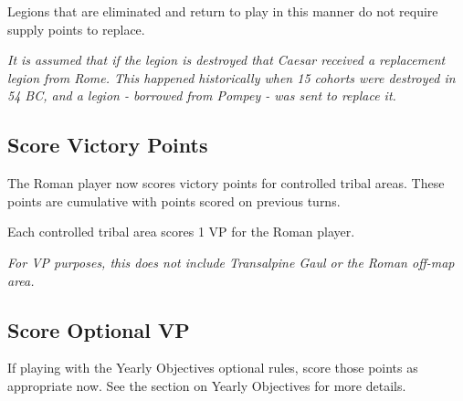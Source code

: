 Legions that are eliminated and return to play in this manner do not require supply points to replace.

\textit{It is assumed that if the legion is destroyed that Caesar received a replacement legion from Rome. This happened historically when 15 cohorts were destroyed in 54 BC, and a legion - borrowed from Pompey - was sent to replace it.}

\subsection{Score Victory Points}
\par
The Roman player now scores victory points for controlled tribal areas. These points are cumulative with points scored on previous turns.

Each controlled tribal area scores 1 VP for the Roman player.

\textit{For VP purposes, this does not include Transalpine Gaul or the Roman off-map area.}

\subsection{Score Optional VP}
If playing with the Yearly Objectives optional rules, score those points as appropriate now. See the section on Yearly Objectives for more details.
